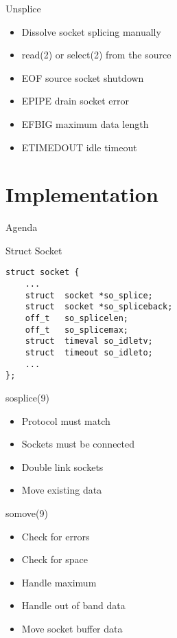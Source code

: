 \documentclass[14pt]{beamer}
\begin{document}
\begin{frame}{Unsplice}
\begin{itemize}
    \item Dissolve socket splicing manually
    \item read(2) or select(2) from the source
    \item EOF source socket shutdown
    \item EPIPE drain socket error
    \item EFBIG maximum data length
    \item ETIMEDOUT idle timeout
\end{itemize}
\end{frame}

\section{Implementation}

\begin{frame}{Agenda}
\tableofcontents[currentsection]
\end{frame}

\begin{frame}[fragile]{Struct Socket}
\begin{verbatim}
struct socket {
    ...
    struct  socket *so_splice;
    struct  socket *so_spliceback;
    off_t   so_splicelen;
    off_t   so_splicemax;
    struct  timeval so_idletv;
    struct  timeout so_idleto;
    ...
};
\end{verbatim}
\end{frame}

\begin{frame}{sosplice(9)}
\begin{itemize}
    \item Protocol must match
    \item Sockets must be connected
    \item Double link sockets
    \item Move existing data
\end{itemize}
\end{frame}

\begin{frame}{somove(9)}
\begin{itemize}
    \item Check for errors
    \item Check for space
    \item Handle maximum
    \item Handle out of band data
    \item Move socket buffer data
\end{itemize}
\end{frame}
\end{document}
